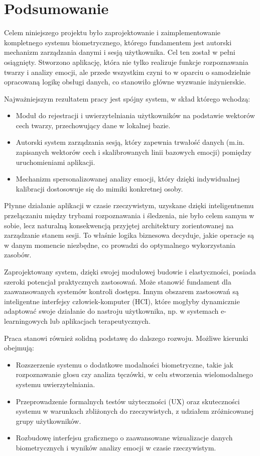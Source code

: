 \chapter{Podsumowanie}
\label{chap:podsumowanie}

Celem niniejszego projektu było zaprojektowanie i zaimplementowanie kompletnego systemu biometrycznego, którego fundamentem jest autorski mechanizm zarządzania danymi i sesją użytkownika. Cel ten został w pełni osiągnięty. Stworzono aplikację, która nie tylko realizuje funkcje rozpoznawania twarzy i analizy emocji, ale przede wszystkim czyni to w oparciu o samodzielnie opracowaną logikę obsługi danych, co stanowiło główne wyzwanie inżynierskie.

Najważniejszym rezultatem pracy jest spójny system, w skład którego wchodzą:
\begin{itemize}
    \item Moduł do rejestracji i uwierzytelniania użytkowników na podstawie wektorów cech twarzy, przechowujący dane w lokalnej bazie.
    \item Autorski system zarządzania sesją, który zapewnia trwałość danych (m.in. zapisanych wektorów cech i skalibrowanych linii bazowych emocji) pomiędzy uruchomieniami aplikacji.
    \item Mechanizm spersonalizowanej analizy emocji, który dzięki indywidualnej kalibracji dostosowuje się do mimiki konkretnej osoby.
\end{itemize}

Płynne działanie aplikacji w czasie rzeczywistym, uzyskane dzięki inteligentnemu przełączaniu między trybami rozpoznawania i śledzenia, nie było celem samym w sobie, lecz naturalną konsekwencją przyjętej architektury zorientowanej na zarządzanie stanem sesji. To właśnie logika biznesowa decyduje, jakie operacje są w danym momencie niezbędne, co prowadzi do optymalnego wykorzystania zasobów.

Zaprojektowany system, dzięki swojej modułowej budowie i elastyczności, posiada szeroki potencjał praktycznych zastosowań. Może stanowić fundament dla zaawansowanych systemów kontroli dostępu. Innym obszarem zastosowań są inteligentne interfejsy człowiek-komputer (HCI), które mogłyby dynamicznie adaptować swoje działanie do nastroju użytkownika, np. w systemach e-learningowych lub aplikacjach terapeutycznych.

Praca stanowi również solidną podstawę do dalszego rozwoju. Możliwe kierunki obejmują:
\begin{itemize}
    \item Rozszerzenie systemu o dodatkowe modalności biometryczne, takie jak rozpoznawanie głosu czy analiza tęczówki, w celu stworzenia wielomodalnego systemu uwierzytelniania.
    \item Przeprowadzenie formalnych testów użyteczności (UX) oraz skuteczności systemu w warunkach zbliżonych do rzeczywistych, z udziałem zróżnicowanej grupy użytkowników.
    \item Rozbudowę interfejsu graficznego o zaawansowane wizualizacje danych biometrycznych i wyników analizy emocji w czasie rzeczywistym.
\end{itemize}
